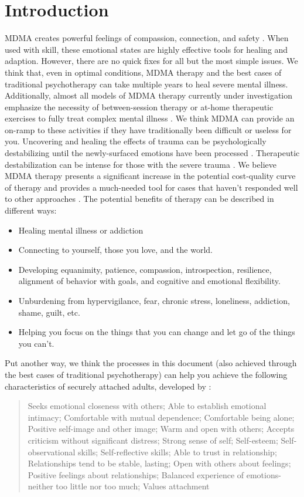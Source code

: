\documentclass[12pt,letterpaper]{book}
\begin{document}
\section{Introduction}
\label{sec:introduction}
MDMA creates powerful feelings of compassion, connection, and safety \cite{fedduciaMDMAMemoryReconsolidation}. When used with skill, these emotional states are highly effective tools for healing and adaption. However, there are no quick fixes for all but the most simple issues. We think that, even in optimal conditions, MDMA therapy and the best cases of traditional psychotherapy can take multiple years to heal severe mental illness. Additionally, almost all models of MDMA therapy currently under investigation emphasize the necessity of between-session therapy or at-home therapeutic exercises to fully treat complex mental illness \cite{bathje2022Integration}. We think MDMA can provide an on-ramp to these activities if they have traditionally been difficult or useless for you. Uncovering and healing the effects of trauma can be psychologically destabilizing until the newly-surfaced emotions have been processed \cite{olthofDestabilization}. Therapeutic destabilization can be intense for those with the severe trauma \cite{studyingHarms}. We believe MDMA therapy presents a significant increase in the potential cost-quality curve of therapy and provides a much-needed tool for cases that haven't responded well to other approaches \cite{mitchellMDMAClinicalTrial2}. The potential benefits of therapy can be described in different ways:
\begin{itemize}
    \item Healing mental illness or addiction
    \item Connecting to yourself, those you love, and the world.
    \item Developing equanimity, patience, compassion, introspection, resilience, alignment of behavior with goals, and cognitive and emotional flexibility.
    \item Unburdening from hypervigilance, fear, chronic stress, loneliness, addiction, shame, guilt, etc.
    \item Helping you focus on the things that you can change and let go of the things you can't.
\end{itemize}

Put another way, we think the processes in this document (also achieved through the best cases of traditional psychotherapy) can help you achieve the following characteristics of securely attached adults, developed by \textcite{brownAttachmentDisturbances}:
\begin{quotation}
Seeks emotional closeness with others; Able to establish emotional intimacy; Comfortable with mutual dependence; Comfortable being alone; Positive self-image and other image; Warm and open with others; Accepts criticism without significant distress; Strong sense of self; Self-esteem; Self-observational skills; Self-reflective skills; Able to trust in relationship; Relationships tend to be stable, lasting; Open with others about feelings; Positive feelings about relationships; Balanced experience of emotions-neither too little nor too much; Values attachment
\end{quotation}
\end{document}
